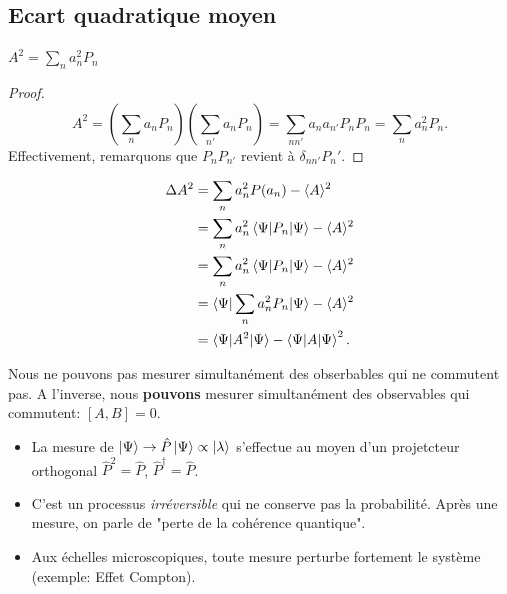 \documentclass[../notesdecours.tex]{subfiles}
\begin{document}
\subsection{Ecart quadratique moyen}
\begin{lemma}
$A^2 = \sum_n a_n^2P_n$
\end{lemma}
\begin{proof}
\begin{equation*}
A^2 = (\sum_n a_nP_n)(\sum_{n'} a_nP_n) = \sum_{nn'} a_na_{n'}P_nP_{n} = \sum_n a_n^2P_n.
\end{equation*}
Effectivement, remarquons que $P_nP_{n'}$ revient à $\delta_{nn'}P_n'$.
\end{proof}
\begin{align*}
\Delta A^2 &= \sum_n a_n^2 P(a_n) - \langle A\rangle^2\\
&= \sum_n a_n^2 \braket{\Psi|P_n|\Psi} - \langle A\rangle^2\\
&= \sum_n a_n^2 \braket{\Psi|P_n|\Psi} - \langle A\rangle^2\\
&= \braket{\Psi|\sum_n a_n^2 P_n|\Psi} - \langle A\rangle^2\\
&= \braket{\Psi|A^2|\Psi} - \braket{\Psi|A|\Psi}^2.
\end{align*}

\begin{remark} Nous ne pouvons pas mesurer simultanément des obserbables qui ne commutent pas. A l'inverse, nous \textbf{pouvons} mesurer simultanément des observables qui commutent: $[A,B] = 0$. \end{remark}

\begin{center}
\end{center}

\begin{itemize}
\item La mesure de $\ket{\Psi} \rightarrow \hat{P}\ket{\Psi} \propto \ket{\lambda}$ s'effectue au moyen d'un projetcteur orthogonal $\hat{P}^2 = \hat{P}$, $\hat{P}^\dagger = \hat{P}$.
\item C'est un processus \textit{irréversible} qui ne conserve pas la probabilité. Après une mesure, on parle de "perte de la cohérence quantique".
\item Aux échelles microscopiques, toute mesure perturbe fortement le système (exemple: Effet Compton). 
\end{itemize}
\end{document}
